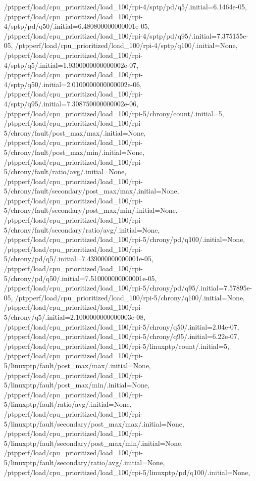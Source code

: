 {    /ptpperf/load/cpu_prioritized/load_100/rpi-4/sptp/pd/q5/.initial=6.1464e-05,
    /ptpperf/load/cpu_prioritized/load_100/rpi-4/sptp/pd/q50/.initial=6.480800000000001e-05,
    /ptpperf/load/cpu_prioritized/load_100/rpi-4/sptp/pd/q95/.initial=7.375155e-05,
    /ptpperf/load/cpu_prioritized/load_100/rpi-4/sptp/q100/.initial=None,
    /ptpperf/load/cpu_prioritized/load_100/rpi-4/sptp/q5/.initial=1.9300000000000002e-07,
    /ptpperf/load/cpu_prioritized/load_100/rpi-4/sptp/q50/.initial=2.0100000000000002e-06,
    /ptpperf/load/cpu_prioritized/load_100/rpi-4/sptp/q95/.initial=7.308750000000002e-06,
    /ptpperf/load/cpu_prioritized/load_100/rpi-5/chrony/count/.initial=5,
    /ptpperf/load/cpu_prioritized/load_100/rpi-5/chrony/fault/post_max/max/.initial=None,
    /ptpperf/load/cpu_prioritized/load_100/rpi-5/chrony/fault/post_max/min/.initial=None,
    /ptpperf/load/cpu_prioritized/load_100/rpi-5/chrony/fault/ratio/avg/.initial=None,
    /ptpperf/load/cpu_prioritized/load_100/rpi-5/chrony/fault/secondary/post_max/max/.initial=None,
    /ptpperf/load/cpu_prioritized/load_100/rpi-5/chrony/fault/secondary/post_max/min/.initial=None,
    /ptpperf/load/cpu_prioritized/load_100/rpi-5/chrony/fault/secondary/ratio/avg/.initial=None,
    /ptpperf/load/cpu_prioritized/load_100/rpi-5/chrony/pd/q100/.initial=None,
    /ptpperf/load/cpu_prioritized/load_100/rpi-5/chrony/pd/q5/.initial=7.439000000000001e-05,
    /ptpperf/load/cpu_prioritized/load_100/rpi-5/chrony/pd/q50/.initial=7.510000000000001e-05,
    /ptpperf/load/cpu_prioritized/load_100/rpi-5/chrony/pd/q95/.initial=7.57895e-05,
    /ptpperf/load/cpu_prioritized/load_100/rpi-5/chrony/q100/.initial=None,
    /ptpperf/load/cpu_prioritized/load_100/rpi-5/chrony/q5/.initial=2.1000000000000003e-08,
    /ptpperf/load/cpu_prioritized/load_100/rpi-5/chrony/q50/.initial=2.04e-07,
    /ptpperf/load/cpu_prioritized/load_100/rpi-5/chrony/q95/.initial=6.22e-07,
    /ptpperf/load/cpu_prioritized/load_100/rpi-5/linuxptp/count/.initial=5,
    /ptpperf/load/cpu_prioritized/load_100/rpi-5/linuxptp/fault/post_max/max/.initial=None,
    /ptpperf/load/cpu_prioritized/load_100/rpi-5/linuxptp/fault/post_max/min/.initial=None,
    /ptpperf/load/cpu_prioritized/load_100/rpi-5/linuxptp/fault/ratio/avg/.initial=None,
    /ptpperf/load/cpu_prioritized/load_100/rpi-5/linuxptp/fault/secondary/post_max/max/.initial=None,
    /ptpperf/load/cpu_prioritized/load_100/rpi-5/linuxptp/fault/secondary/post_max/min/.initial=None,
    /ptpperf/load/cpu_prioritized/load_100/rpi-5/linuxptp/fault/secondary/ratio/avg/.initial=None,
    /ptpperf/load/cpu_prioritized/load_100/rpi-5/linuxptp/pd/q100/.initial=None,
}
